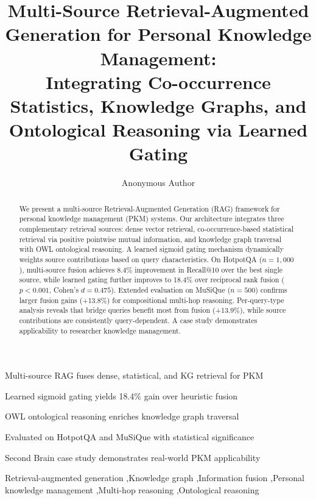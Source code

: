 \documentclass[preprint,12pt]{elsarticle}
\begin{document}
\begin{frontmatter}

\title{Multi-Source Retrieval-Augmented Generation for Personal Knowledge Management: \\
Integrating Co-occurrence Statistics, Knowledge Graphs, and Ontological Reasoning via Learned Gating}

\author[inst1]{Anonymous Author}

\begin{highlights}
\item Multi-source RAG fuses dense, statistical, and KG retrieval for PKM
\item Learned sigmoid gating yields 18.4\% gain over heuristic fusion
\item OWL ontological reasoning enriches knowledge graph traversal
\item Evaluated on HotpotQA and MuSiQue with statistical significance
\item Second Brain case study demonstrates real-world PKM applicability
\end{highlights}

\begin{abstract}
We present a multi-source Retrieval-Augmented Generation (RAG) framework for personal knowledge management (PKM) systems. Our architecture integrates three complementary retrieval sources: dense vector retrieval, co-occurrence-based statistical retrieval via positive pointwise mutual information, and knowledge graph traversal with OWL ontological reasoning. A learned sigmoid gating mechanism dynamically weights source contributions based on query characteristics. On HotpotQA ($n=1{,}000$), multi-source fusion achieves 8.4\% improvement in Recall@10 over the best single source, while learned gating further improves to 18.4\% over reciprocal rank fusion ($p<0.001$, Cohen's $d=0.475$). Extended evaluation on MuSiQue ($n=500$) confirms larger fusion gains (+13.8\%) for compositional multi-hop reasoning. Per-query-type analysis reveals that bridge queries benefit most from fusion (+13.9\%), while source contributions are consistently query-dependent. A case study demonstrates applicability to researcher knowledge management.
\end{abstract}

\begin{keyword}
Retrieval-augmented generation \sep Knowledge graph \sep Information fusion \sep Personal knowledge management \sep Multi-hop reasoning \sep Ontological reasoning
\end{keyword}

\end{frontmatter}
\end{document}
